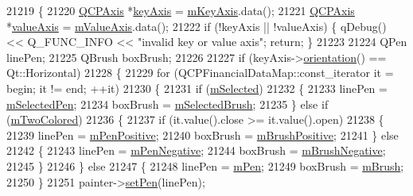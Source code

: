 \begin{DoxyCode}
21219 \{
21220   \hyperlink{class_q_c_p_axis}{QCPAxis} *\hyperlink{class_q_c_p_abstract_plottable_a72c7a09c22963f2c943f07112b311103}{keyAxis} = \hyperlink{class_q_c_p_abstract_plottable_a426f42e254d0f8ce5436a868c61a6827}{mKeyAxis}.data();
21221   \hyperlink{class_q_c_p_axis}{QCPAxis} *\hyperlink{class_q_c_p_abstract_plottable_a3106f9d34d330a6097a8ec5905e5b519}{valueAxis} = \hyperlink{class_q_c_p_abstract_plottable_a2901452ca4aea911a1827717934a4bda}{mValueAxis}.data();
21222   \textcolor{keywordflow}{if} (!keyAxis || !valueAxis) \{ qDebug() << Q\_FUNC\_INFO << \textcolor{stringliteral}{"invalid key or value axis"}; \textcolor{keywordflow}{return}; \}
21223   
21224   QPen linePen;
21225   QBrush boxBrush;
21226   
21227   \textcolor{keywordflow}{if} (keyAxis->\hyperlink{class_q_c_p_axis_a57483f2f60145ddc9e63f3af53959265}{orientation}() == Qt::Horizontal)
21228   \{
21229     \textcolor{keywordflow}{for} (QCPFinancialDataMap::const\_iterator it = begin; it != end; ++it)
21230     \{
21231       \textcolor{keywordflow}{if} (\hyperlink{class_q_c_p_abstract_plottable_a43f68a0603e9bcd016bdfa6d9d5c41c9}{mSelected})
21232       \{
21233         linePen = \hyperlink{class_q_c_p_abstract_plottable_a10619472f5d5e10e9519a599f1cf5576}{mSelectedPen};
21234         boxBrush = \hyperlink{class_q_c_p_abstract_plottable_aea3c0da30c7a8be23ad5f2d9bca36762}{mSelectedBrush};
21235       \} \textcolor{keywordflow}{else} \textcolor{keywordflow}{if} (\hyperlink{class_q_c_p_financial_a6afe919190b884d9bac026cefcc8c0a8}{mTwoColored})
21236       \{
21237         \textcolor{keywordflow}{if} (it.value().close >= it.value().open)
21238         \{
21239           linePen = \hyperlink{class_q_c_p_financial_aa6599186f417ba615caebb3f6c762bd8}{mPenPositive};
21240           boxBrush = \hyperlink{class_q_c_p_financial_ab7e6eed16260a2f88ca6bd940dffea79}{mBrushPositive};
21241         \} \textcolor{keywordflow}{else}
21242         \{
21243           linePen = \hyperlink{class_q_c_p_financial_a263fbfefde2cc19c8d4024a8319c2bbb}{mPenNegative};
21244           boxBrush = \hyperlink{class_q_c_p_financial_acb0e31874b7a1deb56bd42e8ab3e68f2}{mBrushNegative};
21245         \}
21246       \} \textcolor{keywordflow}{else}
21247       \{
21248         linePen = \hyperlink{class_q_c_p_abstract_plottable_a67bc0622fd1b9fa14e54c14922dcec66}{mPen};
21249         boxBrush = \hyperlink{class_q_c_p_abstract_plottable_a33f00674c0161c13315ab9da0895418e}{mBrush};
21250       \}
21251       painter->\hyperlink{class_q_c_p_painter_af9c7a4cd1791403901f8c5b82a150195}{setPen}(linePen);

\end{DoxyCode}

